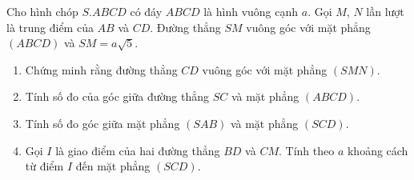 \begin{bt}%
Cho hình chóp $S.ABCD$ có đáy $ABCD$ là hình vuông cạnh $a$. Gọi $M$, $N$ lần lượt là trung điểm của $AB$ và $CD$. Đường thẳng $SM$ vuông góc với mặt phẳng $(ABCD)$ và $SM=a\sqrt{5}$.
\begin{enumerate}
\item Chứng minh rằng đường thẳng $CD$ vuông góc với mặt phẳng $(SMN)$.
\item Tính số đo của góc giữa đường thẳng $SC$ và mặt phẳng $(ABCD)$.
\item Tính số đo góc giữa mặt phẳng $(SAB)$ và mặt phẳng $(SCD)$.
\item Gọi $I$ là giao điểm của hai đường thẳng $BD$ và $CM$. Tính theo $a$ khoảng cách từ điểm $I$ đến mặt phẳng $(SCD)$.
\end{enumerate}
\end{bt}
